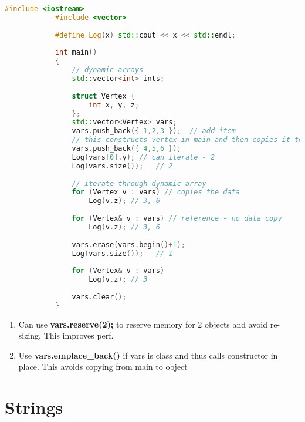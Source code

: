 \documentclass{article}
\begin{document}
        \begin{lstlisting}[language=C++, caption=std::vector example]
            #include <iostream>
            #include <vector>
            
            #define Log(x) std::cout << x << std::endl;
            
            int main()
            {
            	// dynamic arrays
            	std::vector<int> ints;
            
            	struct Vertex {
            		int x, y, z;
            	};
            	std::vector<Vertex> vars;
            	vars.push_back({ 1,2,3 });	// add item
            	// this constructs vertex in main and then copies it to struct/class
	            vars.push_back({ 4,5,6 });
            	Log(vars[0].y); // can iterate - 2
            	Log(vars.size());	// 2
            
            	// iterate through dynamic array
            	for (Vertex v : vars) // copies the data
            		Log(v.z); // 3, 6
            
            	for (Vertex& v : vars) // reference - no data copy
            		Log(v.z); // 3, 6
            
            	vars.erase(vars.begin()+1);
            	Log(vars.size());	// 1
            	
            	for (Vertex& v : vars) 
            		Log(v.z); // 3
            	
            	vars.clear();
            } 
        \end{lstlisting}
        
        \begin{enumerate}
            \item Can use \textbf{vars.reserve(2);} to reserve memory for 2 objects and avoid re-sizing. This improves perf. 
            \item Use \textbf{vars.emplace\_back()} if vars is class and thus calls constructor in place. This avoids copying from main to object
        \end{enumerate}
        

\section{Strings}
\end{document}
